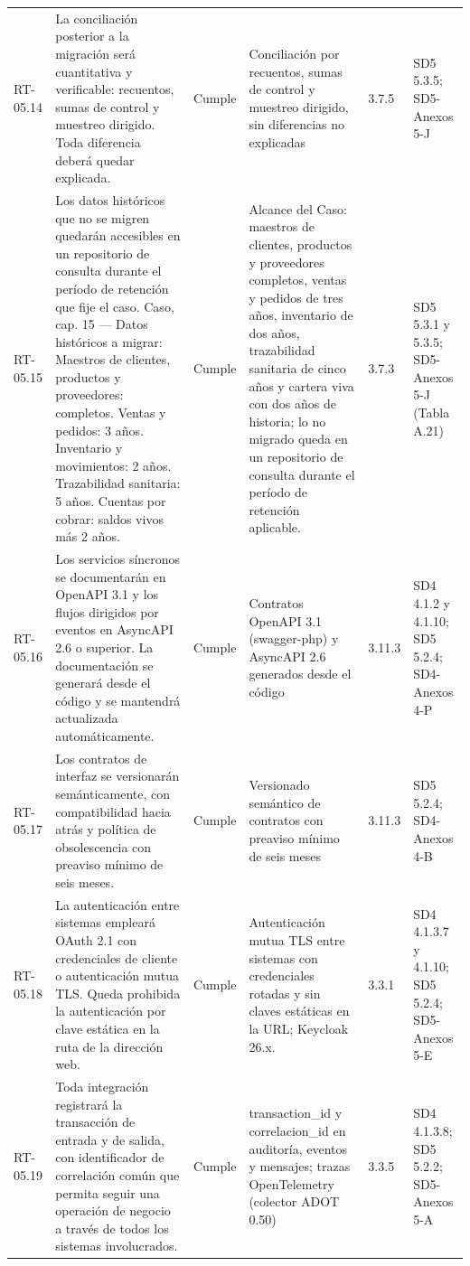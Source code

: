 \documentclass[carta,firma,final]{lafrox}
\begin{document}
\begin{landscape}
{\begin{longtable}{@{}F{0.070} F{0.255} F{0.075} F{0.280} F{0.090} F{0.230}@{}}
  RT-05.14 & La conciliación posterior a la migración será cuantitativa y verificable: recuentos, sumas de control y muestreo dirigido. Toda diferencia deberá quedar explicada. & Cumple & Conciliación por recuentos, sumas de control y muestreo dirigido, sin diferencias no explicadas & 3.7.5 & SD5 5.3.5; SD5-Anexos 5-J \\
  RT-05.15 & Los datos históricos que no se migren quedarán accesibles en un repositorio de consulta durante el período de retención que fije el caso. Caso, cap. 15 — Datos históricos a migrar: Maestros de clientes, productos y proveedores: completos. Ventas y pedidos: 3 años. Inventario y movimientos: 2 años. Trazabilidad sanitaria: 5 años. Cuentas por cobrar: saldos vivos más 2 años. & Cumple & Alcance del Caso: maestros de clientes, productos y proveedores completos, ventas y pedidos de tres años, inventario de dos años, trazabilidad sanitaria de cinco años y cartera viva con dos años de historia; lo no migrado queda en un repositorio de consulta durante el período de retención aplicable. & 3.7.3 & SD5 5.3.1 y 5.3.5; SD5-Anexos 5-J (Tabla A.21) \\
  RT-05.16 & Los servicios síncronos se documentarán en OpenAPI 3.1 y los flujos dirigidos por eventos en AsyncAPI 2.6 o superior. La documentación se generará desde el código y se mantendrá actualizada automáticamente. & Cumple & Contratos OpenAPI 3.1 (swagger-php) y AsyncAPI 2.6 generados desde el código & 3.11.3 & SD4 4.1.2 y 4.1.10; SD5 5.2.4; SD4-Anexos 4-P \\
  RT-05.17 & Los contratos de interfaz se versionarán semánticamente, con compatibilidad hacia atrás y política de obsolescencia con preaviso mínimo de seis meses. & Cumple & Versionado semántico de contratos con preaviso mínimo de seis meses & 3.11.3 & SD5 5.2.4; SD4-Anexos 4-B \\
  RT-05.18 & La autenticación entre sistemas empleará OAuth 2.1 con credenciales de cliente o autenticación mutua TLS. Queda prohibida la autenticación por clave estática en la ruta de la dirección web. & Cumple & Autenticación mutua TLS entre sistemas con credenciales rotadas y sin claves estáticas en la URL; Keycloak 26.x. & 3.3.1 & SD4 4.1.3.7 y 4.1.10; SD5 5.2.4; SD5-Anexos 5-E \\
  RT-05.19 & Toda integración registrará la transacción de entrada y de salida, con identificador de correlación común que permita seguir una operación de negocio a través de todos los sistemas involucrados. & Cumple & transaction\_id y correlacion\_id en auditoría, eventos y mensajes; trazas OpenTelemetry (colector ADOT 0.50) & 3.3.5 & SD4 4.1.3.8; SD5 5.2.2; SD5-Anexos 5-A \\

\end{longtable}}
\end{landscape}
\end{document}
